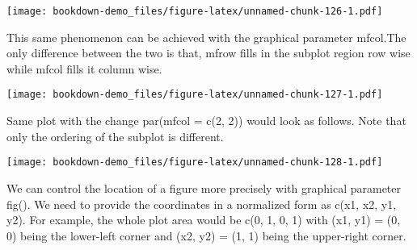 \documentclass[]{book}
\newenvironment{Shaded}{\begin{snugshade}}{\end{snugshade}}
\newcommand{\KeywordTok}[1]{\textcolor[rgb]{0.13,0.29,0.53}{\textbf{#1}}}
\newcommand{\DataTypeTok}[1]{\textcolor[rgb]{0.13,0.29,0.53}{#1}}
\newcommand{\DecValTok}[1]{\textcolor[rgb]{0.00,0.00,0.81}{#1}}
\newcommand{\StringTok}[1]{\textcolor[rgb]{0.31,0.60,0.02}{#1}}
\newcommand{\OtherTok}[1]{\textcolor[rgb]{0.56,0.35,0.01}{#1}}
\newcommand{\OperatorTok}[1]{\textcolor[rgb]{0.81,0.36,0.00}{\textbf{#1}}}
\newcommand{\NormalTok}[1]{#1}
\theoremstyle{definition}
\theoremstyle{definition}
\theoremstyle{definition}
\theoremstyle{remark}
\begin{document}
\texttt{[image: bookdown-demo\_files/figure-latex/unnamed-chunk-126-1.pdf]}

This same phenomenon can be achieved with the graphical parameter
mfcol.The only difference between the two is that, mfrow fills in the
subplot region row wise while mfcol fills it column wise.

\begin{Shaded}
\end{Shaded}

\texttt{[image: bookdown-demo\_files/figure-latex/unnamed-chunk-127-1.pdf]}

Same plot with the change par(mfcol = c(2, 2)) would look as follows.
Note that only the ordering of the subplot is different.

\begin{Shaded}
\end{Shaded}

\texttt{[image: bookdown-demo\_files/figure-latex/unnamed-chunk-128-1.pdf]}

We can control the location of a figure more precisely with graphical
parameter fig(). We need to provide the coordinates in a normalized form
as c(x1, x2, y1, y2). For example, the whole plot area would be c(0, 1,
0, 1) with (x1, y1) = (0, 0) being the lower-left corner and (x2, y2) =
(1, 1) being the upper-right corner.
\end{document}
